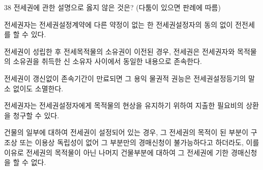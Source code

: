 \begin{question}{38}
전세권에 관한 설명으로 옳지 않은 것은? (다툼이 있으면 판례에 따름)
\begin{choices}
  \item 전세권자는 전세권설정계약에 다른 약정이 없는 한 전세권설정자의 동의 없이 전전세를 할 수 있다.
  \item 전세권이 성립한 후 전세목적물의 소유권이 이전된 경우, 전세권은 전세권자와 목적물의 소유권을 취득한 신 소유자 사이에서 동일한 내용으로 존속한다.
  \item 전세권이 갱신없이 존속기간이 만료되면 그 용익 물권적 권능은 전세권설정등기의 말소 없이도 소멸한다.
  \item 전세권자는 전세권설정자에게 목적물의 현상을 유지하기 위하여 지출한 필요비의 상환을 청구할 수 있다.
  \item 건물의 일부에 대하여 전세권이 설정되어 있는 경우, 그 전세권의 목적이 된 부분이 구조상 또는 이용상 독립성이 없어 그 부분만의 경매신청이 불가능하다고 하더라도, 이를 이유로 전세권의 목적물이 아닌 나머지 건물부분에 대하여 그 전세권에 기한 경매신청을 할 수 없다.
\end{choices}
\end{question}
